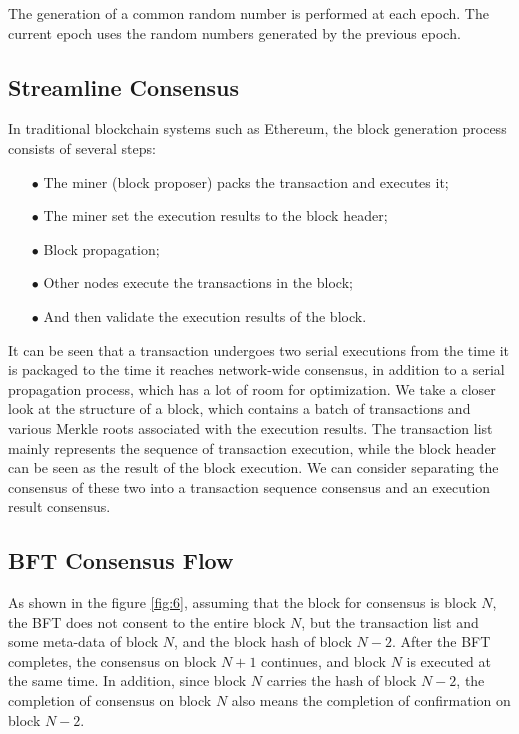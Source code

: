 \documentclass{iacrtrans}
\begin{document}
The generation of a common random number is performed at each epoch. The current epoch uses the random numbers generated by the previous epoch.


\subsection{Streamline Consensus}
In traditional blockchain systems such as Ethereum, the block generation process consists of several steps:
\begin{itemize}
	\item[$\bullet$] The miner (block proposer) packs the transaction and executes it;
	\item[$\bullet$] The miner set the execution results to the block header;
	\item[$\bullet$] Block propagation;
	\item[$\bullet$] Other nodes execute the transactions in the block;
	\item[$\bullet$] And then validate the execution results of the block.
\end{itemize}

It can be seen that a transaction undergoes two serial executions from the time it is packaged to the time it reaches network-wide consensus, in addition to a serial propagation process, which has a lot of room for optimization.
We take a closer look at the structure of a block, which contains a batch of transactions and various Merkle roots associated with the execution results.
The transaction list mainly represents the sequence of transaction execution, while the block header can be seen as the result of the block execution. We can consider separating the consensus of these two into a transaction sequence consensus and an execution result consensus.


\subsection{BFT Consensus Flow}
As shown in the figure \ref{fig:6}, assuming that the block for consensus is block $N$, the BFT does not consent to the entire block $N$, but the transaction list and some meta-data of block $N$, and the block hash of block $N-2$. After the BFT completes, the consensus on block $N+1$ continues, and block $N$ is executed at the same time. In addition, since block $N$ carries the hash of block $N-2$, the completion of consensus on block $N$ also means the completion of confirmation on block $N-2$.
\end{document}
